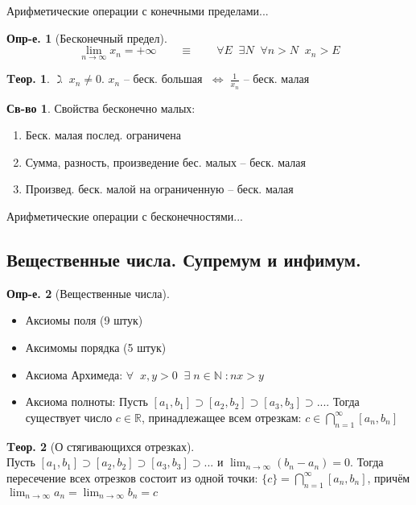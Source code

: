 \documentclass[a4paper,12pt]{article}
\numberwithin{figure}{section}
\theoremstyle{definition}
\newtheorem{definition}{Опр-е.}[section]
\newtheorem*{property}{Св-во}  %
\theoremstyle{definition}
\newtheorem{theorem}{Tеор.}[section]
\def\.{\;\;}
\def\ntoinf{n \to \infty}
\def\mathN{\mathbb{N}}
\def\mathR{\mathbb{R}}
\def\lets {$\gimel\;$}
\def\iff {$\;\Longleftrightarrow\;$}
\begin{document}
Арифметические операции с конечными пределами...

\begin{definition}[Бесконечный предел] \[
	\lim_{\ntoinf} x_n = +\infty
	\qquad\equiv\qquad
	\forall E \. \exists N \. \forall n>N \. x_n>E
	\]
\end{definition}

\begin{theorem}
	\lets $x_n \neq 0$. $x_n$ -- беск. большая \iff $\frac1{x_n}$ -- беск. малая
\end{theorem}

\begin{property}
	Свойства бесконечно малых:
	\begin{enumerate}
		\item Беск. малая послед. ограничена
		\item Сумма, разность, произведение бес. малых -- беск. малая
		\item Произвед. беск. малой на ограниченную -- беск. малая
	\end{enumerate}
\end{property}

Арифметические операции с бесконечностями...


\subsection{Вещественные числа. Супремум и инфимум.}

\begin{definition}[Вещественные числа] \ \\
	\begin{itemize}
		\item Аксиомы поля (9 штук)
		\item Аксимомы порядка (5 штук)
		\item Аксиома Архимеда:
				$ \forall\. x,y>0 \. \exists \; n \in \mathN \;: nx>y $
		\item Аксиома полноты:
			Пусть $[a_1,b_1] \supset [a_2,b_2] \supset [a_3,b_3] \supset...$.
			Тогда существует число $c \in \mathR$, принадлежащее всем отрезкам:
			$\displaystyle c \in \bigcap_{n=1}^{\infty} [a_n,b_n]$
	\end{itemize}
\end{definition}

\begin{theorem}[О стягивающихся отрезках] \ \\
	Пусть $[a_1,b_1] \supset [a_2,b_2] \supset [a_3,b_3] \supset ...$
	и $\displaystyle \lim_{\ntoinf}(b_n-a_n) = 0$.
	Тогда пересечение всех отрезков состоит из одной точки:
	$\displaystyle \{c\} = \bigcap_{n=1}^{\infty} [a_n,b_n]$, причём
	$\displaystyle \lim_{\ntoinf}a_n = \lim_{\ntoinf}b_n = c$
\end{theorem}
\end{document}
